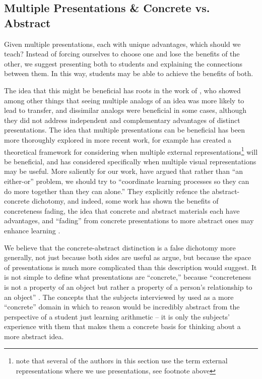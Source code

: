 \documentclass[man,10pt]{apa6}
\begin{document}
\subsection{Multiple Presentations \& Concrete vs. Abstract}
Given multiple presentations, each with unique advantages, which should we teach? Instead of forcing ourselves to choose one and lose the benefits of the other, we suggest presenting both to students and explaining the connections between them. In this way, students may be able to achieve the benefits of both.\par
The idea that this might be beneficial has roots in the work of , who showed among other things that seeing multiple analogs of an idea was more likely to lead to transfer, and dissimilar analogs were beneficial in some cases, although they did not address independent and complementary advantages of distinct presentations. The idea that multiple presentations can be beneficial has been more thoroughly explored in more recent work, for example  has created a theoretical framework for considering when multiple external representations\footnote{note that several of the authors in this section use the term external representations where we use presentations, see footnote above} will be beneficial, and  has considered specifically when multiple visual representations may be useful. More saliently for our work,  have argued that rather than ``an either-or'' problem, we should try to ``coordinate learning processes so they can do more together than they can alone.'' They explicitly refence the abstract-concrete dichotomy, and indeed, some work has shown the benefits of concreteness fading, the idea that concrete and abstract materials each have advantages, and ``fading'' from concrete presentations to more abstract ones may enhance learning \cite{Fyfe2014}. \par
We believe that the concrete-abstract distinction is a false dichotomy more generally, not just because both sides are useful as  argue, but because the space of presentations is much more complicated than this description would suggest. It is not simple to define what presentations are ``concrete,'' because ``concreteness is not a property of an object but rather a property of a person's relationship to an object'' \cite{Wilensky1991}. The concepts that the subjects interviewed by  used as a more ``concrete'' domain in which to reason would be incredibly abstract from the perspective of a student just learning arithmetic -- it is only the subjects' experience with them that makes them a concrete basis for thinking about a more abstract idea. \par
\end{document}
